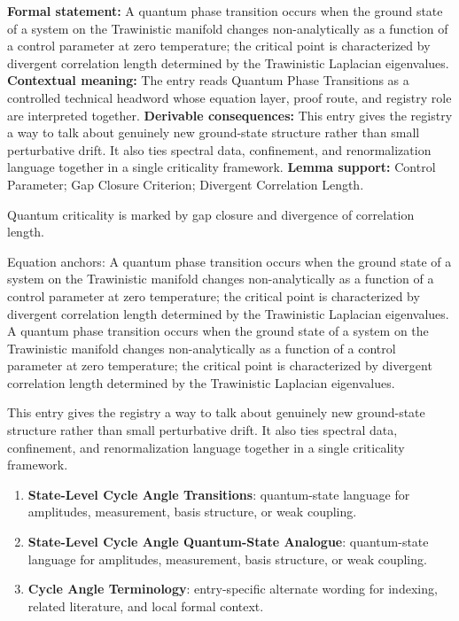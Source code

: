 \begingroup\footnotesize\setlength{\emergencystretch}{3em}\sloppy
\textbf{Formal statement:} A quantum phase transition occurs when the ground state of a system on the Trawinistic manifold changes non-analytically as a function of a control parameter at zero temperature; the critical point is characterized by divergent correlation length determined by the Trawinistic Laplacian eigenvalues. \textbf{Contextual meaning:} The entry reads Quantum Phase Transitions as a controlled technical headword whose equation layer, proof route, and registry role are interpreted together. \textbf{Derivable consequences:} This entry gives the registry a way to talk about genuinely new ground-state structure rather than small perturbative drift. It also ties spectral data, confinement, and renormalization language together in a single criticality framework. \textbf{Lemma support:} Control Parameter; Gap Closure Criterion; Divergent Correlation Length.\par
\endgroup

Quantum criticality is marked by gap closure and divergence of correlation length.

Equation anchors: A quantum phase transition occurs when the ground state of a system on the Trawinistic manifold changes non-analytically as a function of a control parameter at zero temperature; the critical point is characterized by divergent correlation length determined by the Trawinistic Laplacian eigenvalues. A quantum phase transition occurs when the ground state of a system on the Trawinistic manifold changes non-analytically as a function of a control parameter at zero temperature; the critical point is characterized by divergent correlation length determined by the Trawinistic Laplacian eigenvalues.

This entry gives the registry a way to talk about genuinely new ground-state structure rather than small perturbative drift. It also ties spectral data, confinement, and renormalization language together in a single criticality framework.
\endgroup

\begingroup\footnotesize\sloppy
\begin{enumerate}[leftmargin=1.35em,itemsep=1pt,topsep=1pt,parsep=0pt]
\item \textbf{State-Level Cycle Angle Transitions}: quantum-state language for amplitudes, measurement, basis structure, or weak coupling.
\item \textbf{State-Level Cycle Angle Quantum-State Analogue}: quantum-state language for amplitudes, measurement, basis structure, or weak coupling.
\item \textbf{Cycle Angle Terminology}: entry-specific alternate wording for indexing, related literature, and local formal context.
\end{enumerate}
\endgroup

